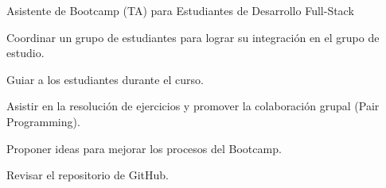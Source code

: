 \begin{cventries}
{\begin{cvitems}
        \item {Asistente de Bootcamp (TA) para Estudiantes de Desarrollo Full-Stack}
        \item {Coordinar un grupo de estudiantes para lograr su integración en el grupo de estudio.}
        \item{Guiar a los estudiantes durante el curso.}
        \item{Asistir en la resolución de ejercicios y promover la colaboración grupal (Pair Programming).}
        \item{Proponer ideas para mejorar los procesos del Bootcamp.}
        \item{Revisar el repositorio de GitHub.}
      \end{cvitems}
    }

\end{cventries}
